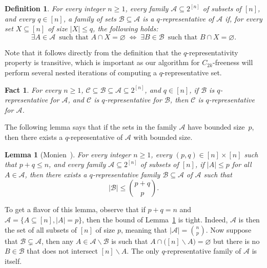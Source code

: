 \documentclass{article}
\newtheorem{lemma}{Lemma}
\newtheorem{definition}{Definition}
\newtheorem{fact}{Fact}
\begin{document}
\begin{definition}\label{def:q-rep}
For every integer $n\geq 1$, every family $\mathcal{A}\subseteq 2^{[n]}$ of subsets of $[n]$, and every $q\in [n]$, a family of sets $\mathcal{B}\subseteq \mathcal{A}$ is a \emph{$q$-representative} of $\mathcal{A}$ if, for every set $X\subseteq [n]$ of size $|X|\leq q$, the following holds:
\[
\exists A\in\mathcal{A} \,\text{ such that } A\cap X = \varnothing 
\;\iff\; 
\exists B \in \mathcal{B} \,\text{ such that } B \cap X = \varnothing.
\]
\end{definition}

Note that it follows directly from the definition that the $q$-representativity property is transitive, which is important as our algorithm for $C_{2k}$-freeness will perform several nested iterations of computing a $q$-representative set.  

\begin{fact}\label{lem:rep_transi}
For every $n\geq 1$, $\mathcal{C}\subseteq\mathcal{B}\subseteq\mathcal{A}\subseteq 2^{[n]}$, and $q\in [n]$, if $\mathcal{B}$ is $q$-representative for $\mathcal{A}$, and $\mathcal{C}$ is $q$-representative for $\mathcal{B}$, then $\mathcal{C}$ is $q$-representative for $\mathcal{A}$.
\end{fact}

The following lemma says that if the sets in the family $\mathcal{A}$ have bounded size~$p$, then there exists a $q$-representative of $\mathcal{A}$ with bounded size. 

\begin{lemma}[Monien~\cite{monien85}]\label{lem:erdos}
For every integer $n\geq 1$, every $(p,q)\in [n]\times [n]$ such that $p+q\leq n$, and every family $\mathcal{A}\subseteq 2^{[n]}$ of subsets of $[n]$, if $|A|\leq p$ for all $A\in\mathcal{A}$, then  
there exists a $q$-representative family $\mathcal{B}\subseteq \mathcal{A}$ of $\mathcal{A}$ such that 
\[
|\mathcal{B}|\leq \binom{p+q}{p}.
\]
\end{lemma}

To get a flavor of this lemma, observe that if $p+q= n$ and $\mathcal{A}=\{A\subseteq [n], |A|=p\}$, then the bound of Lemma~\ref{lem:erdos} is tight. Indeed, $\mathcal{A}$ is then the set of all subsets of $[n]$ of size $p$, meaning that $|\mathcal{A}|=\binom{n}{p}$. Now suppose that $\mathcal{B}\subsetneq\mathcal{A}$, then any $A\in\mathcal{A}\smallsetminus\mathcal{B}$ is such that $A\cap\big([n]\smallsetminus A\big)=\varnothing$ but there is no $B\in\mathcal{B}$ that does not intersect $[n]\smallsetminus A$. The only $q$-representative family of $\mathcal{A}$ is itself.
\end{document}
